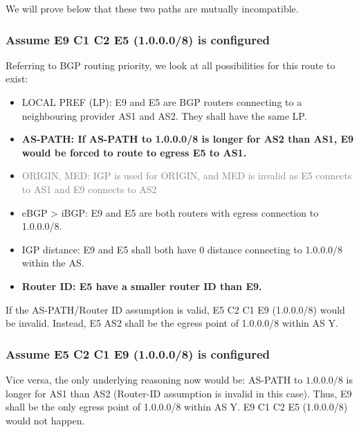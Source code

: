 \documentclass[12pt]{article}
\begin{document}
We will prove below that these two paths are mutually incompatible.

\subsubsection{Assume E9 \textrightarrow{} C1 \textrightarrow{} C2 \textrightarrow{} E5 (1.0.0.0/8) is configured}

Referring to BGP routing priority, we look at all possibilities for this route to exist:
\begin{itemize}
    \item LOCAL PREF (LP): E9 and E5 are BGP routers connecting to a neighbouring provider AS1 and AS2. They shall have the same LP.
    \item \textbf{AS-PATH: If AS-PATH to 1.0.0.0/8 is longer for AS2 than AS1, E9 would be forced to route to egress E5 to AS1.}
    \item \textcolor{grey}{ORIGIN, MED: IGP is used for ORIGIN, and MED is invalid as E5 connects to AS1 and E9 connects to AS2}
    \item eBGP \textgreater{} iBGP: E9 and E5 are both routers with egress connection to 1.0.0.0/8.
    \item IGP distance: E9 and E5 shall both have 0 distance connecting to 1.0.0.0/8 within the AS.
    \item \textbf{Router ID: E5 have a smaller router ID than E9.}
\end{itemize}

If the AS-PATH/Router ID assumption is valid, E5 \textrightarrow{} C2 \textrightarrow{} C1 \textrightarrow{} E9 (1.0.0.0/8) would be invalid. Instead, E5 \textrightarrow{} AS2 shall be the egress point of 1.0.0.0/8 within AS Y.

\subsubsection{Assume E5 \textrightarrow{} C2 \textrightarrow{} C1 \textrightarrow{} E9 (1.0.0.0/8) is configured}

Vice versa, the only underlying reasoning now would be: AS-PATH to $1.0.0.0/8$ is longer for AS1 than AS2 (Router-ID assumption is invalid in this case). Thus, E9 shall be the only egress point of 1.0.0.0/8 within AS Y. E9 \textrightarrow{} C1 \textrightarrow{} C2 \textrightarrow{} E5 (1.0.0.0/8) would not happen.

\subsection{}
\end{document}

